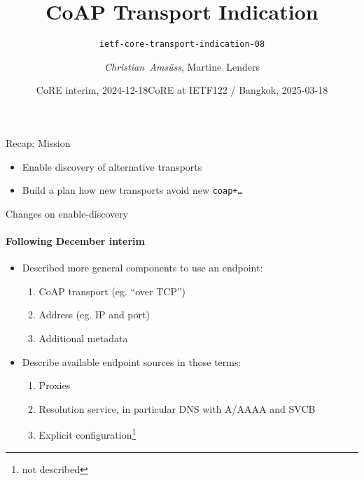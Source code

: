 

\title{CoAP Transport Indication}
\subtitle{\texttt{ietf-core-transport-indication-08}}
\author{\textit{Christian~Amsüss}, Martine~Lenders}
\date{CoRE interim, 2024-12-18}
\date{CoRE at IETF122 / Bangkok, 2025-03-18}



\frame{\titlepage}

\begin{frame}{Recap: Mission}\Large
    \begin{itemize}
        \item Enable discovery of alternative transports

        \item Build a plan how new transports avoid new \texttt{coap+…}
    \end{itemize}
\end{frame}

\begin{frame}{Changes on enable-discovery}\framesubtitle{Following December interim}\Large
    \begin{itemize}
        \item Described more general components to use an endpoint:
            \begin{enumerate}\Large
                \item CoAP transport (eg. ``over TCP'')
                \item Address (eg. IP and port)
                \item Additional metadata
            \end{enumerate}
            \bigskip
        \item Describe available endpoint sources in those terms:
            \begin{enumerate}\Large
                \item Proxies
                \item Resolution service, in particular DNS with A/AAAA and SVCB
                \item \color{gray}Explicit configuration\footnote{not described}
            \end{enumerate}
    \end{itemize}
\end{frame}

